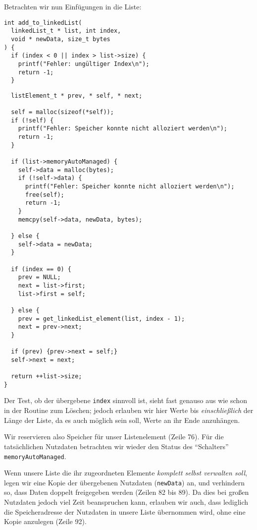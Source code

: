Betrachten wir nun Einfügungen in die Liste:

\begin{codebox}
\begin{verbatim}
int add_to_linkedList(
  linkedList_t * list, int index, 
  void * newData, size_t bytes
) {
  if (index < 0 || index > list->size) {
    printf("Fehler: ungültiger Index\n");
    return -1;
  }
\end{verbatim}
\end{codebox}
%
\begin{codebox}[]
\begin{verbatim}
  listElement_t * prev, * self, * next;
  
  self = malloc(sizeof(*self));
  if (!self) {
    printf("Fehler: Speicher konnte nicht alloziert werden\n");
    return -1;
  }
  
  if (list->memoryAutoManaged) {
    self->data = malloc(bytes);
    if (!self->data) {
      printf("Fehler: Speicher konnte nicht alloziert werden\n");
      free(self);
      return -1;
    }
    memcpy(self->data, newData, bytes);
    
  } else {
    self->data = newData;
  }
  
  if (index == 0) {
    prev = NULL;
    next = list->first;
    list->first = self;
    
  } else {
    prev = get_linkedList_element(list, index - 1);
    next = prev->next;
  }
  
  if (prev) {prev->next = self;}
  self->next = next;
  
  return ++list->size;
}
\end{verbatim}
\end{codebox}

Der Test, ob der übergebene \texttt{index} sinnvoll ist, sieht fast genauso aus wie schon in der Routine zum Löschen; jedoch erlauben wir hier Werte bis \emph{einschließlich} der Länge der Liste, da es auch möglich sein soll, Werte an ihr Ende anzuhängen.

Wir reservieren also Speicher für unser Listenelement (Zeile 76). Für die tatsächlichen Nutzdaten betrachten wir wieder den Status des \enquote{Schalters} \texttt{memoryAutoManaged}.

Wenn unsere Liste die ihr zugeordneten Elemente \emph{komplett selbst verwalten soll}, legen wir eine Kopie der übergebenen Nutzdaten (\texttt{newData}) an, und verhindern so, dass Daten doppelt freigegeben werden (Zeilen 82 bis 89). Da dies bei großen Nutzdaten jedoch viel Zeit beanspruchen kann, erlauben wir auch, dass lediglich die Speicheradresse der Nutzdaten in unsere Liste übernommen wird, ohne eine Kopie anzulegen (Zeile 92).

